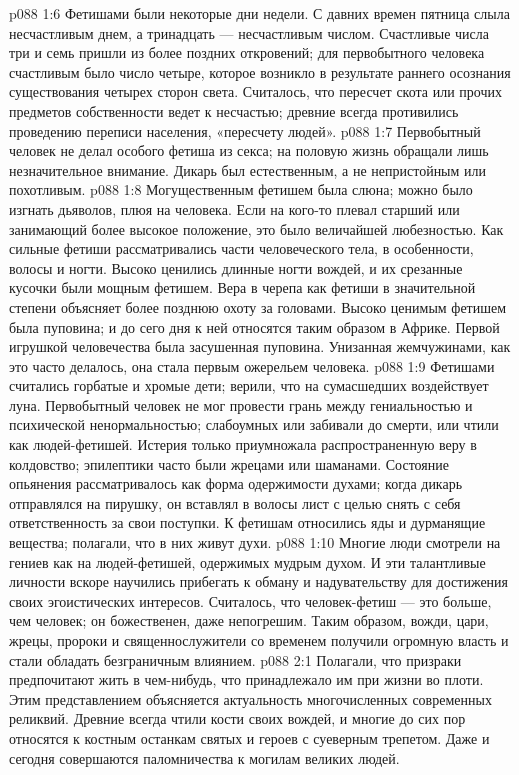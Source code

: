\vs p088 1:6 Фетишами были некоторые дни недели. С давних времен пятница слыла несчастливым днем, а тринадцать --- несчастливым числом. Счастливые числа три и семь пришли из более поздних откровений; для первобытного человека счастливым было число четыре, которое возникло в результате раннего осознания существования четырех сторон света. Считалось, что пересчет скота или прочих предметов собственности ведет к несчастью; древние всегда противились проведению переписи населения, «пересчету людей».
\vs p088 1:7 Первобытный человек не делал особого фетиша из секса; на половую жизнь обращали лишь незначительное внимание. Дикарь был естественным, а не непристойным или похотливым.
\vs p088 1:8 Могущественным фетишем была слюна; можно было изгнать дьяволов, плюя на человека. Если на кого\hyp{}то плевал старший или занимающий более высокое положение, это было величайшей любезностью. Как сильные фетиши рассматривались части человеческого тела, в особенности, волосы и ногти. Высоко ценились длинные ногти вождей, и их срезанные кусочки были мощным фетишем. Вера в черепа как фетиши в значительной степени объясняет более позднюю охоту за головами. Высоко ценимым фетишем была пуповина; и до сего дня к ней относятся таким образом в Африке. Первой игрушкой человечества была засушенная пуповина. Унизанная жемчужинами, как это часто делалось, она стала первым ожерельем человека.
\vs p088 1:9 Фетишами считались горбатые и хромые дети; верили, что на сумасшедших воздействует луна. Первобытный человек не мог провести грань между гениальностью и психической ненормальностью; слабоумных или забивали до смерти, или чтили как людей\hyp{}фетишей. Истерия только приумножала распространенную веру в колдовство; эпилептики часто были жрецами или шаманами. Состояние опьянения рассматривалось как форма одержимости духами; когда дикарь отправлялся на пирушку, он вставлял в волосы лист с целью снять с себя ответственность за свои поступки. К фетишам относились яды и дурманящие вещества; полагали, что в них живут духи.
\vs p088 1:10 Многие люди смотрели на гениев как на людей\hyp{}фетишей, одержимых мудрым духом. И эти талантливые личности вскоре научились прибегать к обману и надувательству для достижения своих эгоистических интересов. Считалось, что человек\hyp{}фетиш --- это больше, чем человек; он божественен, даже непогрешим. Таким образом, вожди, цари, жрецы, пророки и священнослужители со временем получили огромную власть и стали обладать безграничным влиянием.
\vs p088 2:1 Полагали, что призраки предпочитают жить в чем\hyp{}нибудь, что принадлежало им при жизни во плоти. Этим представлением объясняется актуальность многочисленных современных реликвий. Древние всегда чтили кости своих вождей, и многие до сих пор относятся к костным останкам святых и героев с суеверным трепетом. Даже и сегодня совершаются паломничества к могилам великих людей.
